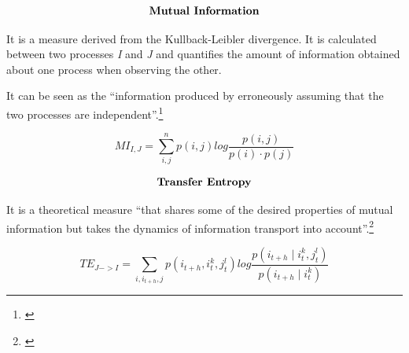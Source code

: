 \begin{frame}
    \begin{align*}
        \centering \textbf{Mutual Information}
     \end{align*}

    It is a measure derived from the Kullback-Leibler divergence. It is calculated between two processes \textit{I} and \textit{J} and quantifies the amount of information obtained about one process when observing the other. 

    
    It can be seen as the ``information produced by erroneously assuming that the two processes are independent''.\footnote{\cite{schreiber2000measuring}}

    \begin{equation}
        \label{eq:mutual}   
            MI_{I, J} = \sum_{i,j}^{n}p(i,j)log \frac{p(i,j)}{p(i)\cdot p(j)}
        \end{equation}

\end{frame}

\begin{frame}
    \begin{align*}
        \centering \textbf{Transfer Entropy}
     \end{align*}

     It is a theoretical measure ``that shares some of the desired properties of mutual information but takes the dynamics of information transport into account''.\footnote{\cite{schreiber2000measuring}}

     \begin{equation} 
        \label{eq:trans-entropy}
        TE_{{J}->{I}} = \sum_{i,i_{t+h},j} p({i}_{t+h}, {i}_{t}^{k}, {j}_{t}^{l}) log\frac{p({i}_{t+h}\mid {i}_{t}^{k}, {j}_{t}^{l})}{p({i}_{t+h}\mid {i}_{t}^{k})}
        \end{equation} 

    
\end{frame}

